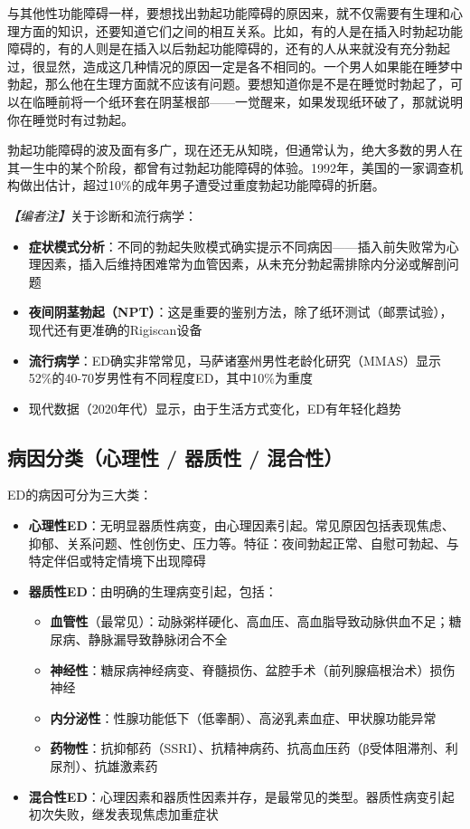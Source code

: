 与其他性功能障碍一样，要想找出勃起功能障碍的原因来，就不仅需要有生理和心理方面的知识，还要知道它们之间的相互关系。比如，有的人是在插入时勃起功能障碍的，有的人则是在插入以后勃起功能障碍的，还有的人从来就没有充分勃起过，很显然，造成这几种情况的原因一定是各不相同的。一个男人如果能在睡梦中勃起，那么他在生理方面就不应该有问题。要想知道你是不是在睡觉时勃起了，可以在临睡前将一个纸环套在阴茎根部——一觉醒来，如果发现纸环破了，那就说明你在睡觉时有过勃起。

勃起功能障碍的波及面有多广，现在还无从知晓，但通常认为，绝大多数的男人在其一生中的某个阶段，都曾有过勃起功能障碍的体验。1992年，美国的一家调查机构做出估计，超过10\%的成年男子遭受过重度勃起功能障碍的折磨。

\noindent\textit{【编者注】}关于诊断和流行病学：
\begin{itemize}
	\item \textbf{症状模式分析}：不同的勃起失败模式确实提示不同病因——插入前失败常为心理因素，插入后维持困难常为血管因素，从未充分勃起需排除内分泌或解剖问题
	\item \textbf{夜间阴茎勃起（NPT）}：这是重要的鉴别方法，除了纸环测试（邮票试验），现代还有更准确的Rigiscan设备
	\item \textbf{流行病学}：ED确实非常常见，马萨诸塞州男性老龄化研究（MMAS）显示52\%的40-70岁男性有不同程度ED，其中10\%为重度
	\item 现代数据（2020年代）显示，由于生活方式变化，ED有年轻化趋势
\end{itemize}

\subsection{病因分类（心理性 / 器质性 / 混合性）}

ED的病因可分为三大类：

\begin{itemize}[leftmargin=2cm]
	\item \textbf{心理性ED}：无明显器质性病变，由心理因素引起。常见原因包括表现焦虑、抑郁、关系问题、性创伤史、压力等。特征：夜间勃起正常、自慰可勃起、与特定伴侣或特定情境下出现障碍
	\item \textbf{器质性ED}：由明确的生理病变引起，包括：
		\begin{itemize}
		\item \textbf{血管性}（最常见）：动脉粥样硬化、高血压、高血脂导致动脉供血不足；糖尿病、静脉漏导致静脉闭合不全
		\item \textbf{神经性}：糖尿病神经病变、脊髓损伤、盆腔手术（前列腺癌根治术）损伤神经
		\item \textbf{内分泌性}：性腺功能低下（低睾酮）、高泌乳素血症、甲状腺功能异常
		\item \textbf{药物性}：抗抑郁药（SSRI）、抗精神病药、抗高血压药（β受体阻滞剂、利尿剂）、抗雄激素药
		\end{itemize}
	\item \textbf{混合性ED}：心理因素和器质性因素并存，是最常见的类型。器质性病变引起初次失败，继发表现焦虑加重症状
\end{itemize}

